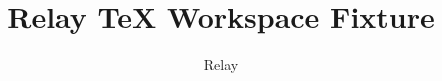 \documentclass{article}
\begin{document}
\title{Relay TeX Workspace Fixture}
\author{Relay}
\maketitle







\end{document}
